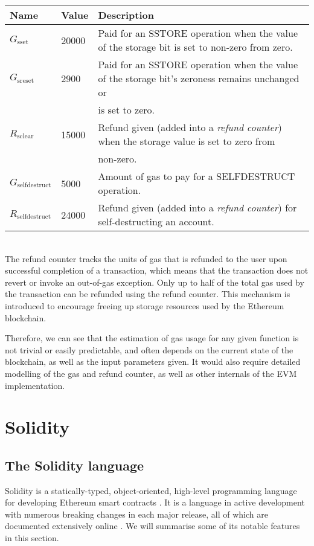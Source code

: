 \setlength{\tabulinesep}{3pt}
\begin{tabu} to \textwidth{|X[1]|X[1]|X[5]|}
  \toprule
  Name & Value & Description \\
  \midrule
  $G_{\mathrm{sset}}$ & 20000 & Paid for an {\small SSTORE} operation when the value of the storage bit is set to non-zero from zero. \\
  $G_{\mathrm{sreset}}$ & 2900 & Paid for an {\small SSTORE} operation when the value of the storage bit's zeroness remains unchanged or\\
  &&is set to zero. \\
  $R_{\mathrm{sclear}}$ & 15000 & Refund given (added into a \textit{refund counter}) when the storage value is set to zero from\\
  &&non-zero.\\
  $G_{\mathrm{selfdestruct}}$ & 5000 & Amount of gas to pay for a {\small SELFDESTRUCT} operation. \\
  $R_{\mathrm{selfdestruct}}$ & 24000 & Refund given (added into a \textit{refund counter}) for self-destructing an account. \\
  \bottomrule
\end{tabu}\\

The refund counter tracks the units of gas that is refunded to the user upon successful
completion of a transaction, which means that the transaction does not revert or invoke an
out-of-gas exception. Only up to half of the total gas used by the transaction can be refunded
using the refund counter. This mechanism is introduced to encourage freeing up storage resources
used by the Ethereum blockchain.

Therefore, we can see that the estimation of gas usage for any given function is not trivial
or easily predictable, and often depends on the current state of the blockchain, as well as the 
input parameters given. It would also require detailed modelling of the gas and refund counter, 
as well as other internals of the EVM implementation.

\section{Solidity}
\subsection{The Solidity language}

Solidity is a statically-typed, object-oriented, high-level programming language for developing
Ethereum smart contracts \cite{ethsolidity}. It is a language in active development with
numerous breaking changes in each major release, all of which are documented extensively online 
\cite{soliditydocs}. We will summarise some of its notable features in this section.

